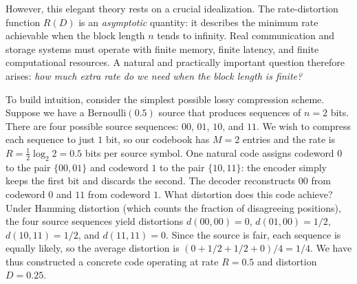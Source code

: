 \documentclass[11pt]{article}
\newcommand{\RD}{R(D)}
\newcommand{\Ber}{\mathrm{Bernoulli}}
\begin{document}
However, this elegant theory rests on a crucial idealization.
The rate-distortion function $\RD$ is an \emph{asymptotic} quantity: it describes
the minimum rate achievable when the block length $n$ tends to infinity.
Real communication and storage systems must operate with finite memory, finite
latency, and finite computational resources.
A natural and practically important question therefore arises: \emph{how much
extra rate do we need when the block length is finite?}

To build intuition, consider the simplest possible lossy compression scheme.
Suppose we have a $\Ber(0.5)$ source that produces sequences of $n = 2$ bits.
There are four possible source sequences: $00$, $01$, $10$, and $11$.
We wish to compress each sequence to just $1$ bit, so our codebook has
$M = 2$ entries and the rate is $R = \frac{1}{2}\log_2 2 = 0.5$ bits per
source symbol.
One natural code assigns codeword $0$ to the pair $\{00, 01\}$ and codeword $1$
to the pair $\{10, 11\}$: the encoder simply keeps the first bit and discards
the second.
The decoder reconstructs $00$ from codeword $0$ and $11$ from codeword $1$.
What distortion does this code achieve?
Under Hamming distortion (which counts the fraction of disagreeing positions),
the four source sequences yield distortions
$d(00, 00) = 0$, $d(01, 00) = 1/2$, $d(10, 11) = 1/2$, and $d(11, 11) = 0$.
Since the source is fair, each sequence is equally likely, so the average
distortion is $(0 + 1/2 + 1/2 + 0)/4 = 1/4$.
We have thus constructed a concrete code operating at rate $R = 0.5$ and
distortion $D = 0.25$.
\end{document}
